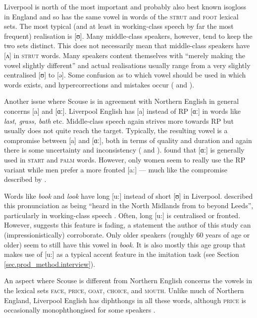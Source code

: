Liverpool is north of the most important and probably also best known isogloss in England and so has the same vowel in words of the \textsc{strut} and \textsc{foot} lexical sets.
The most typical (and at least in working-class speech by far the most frequent) realisation is [ʊ].
Many middle-class speakers, however, tend to keep the two sets distinct.
This does not necessarily mean that middle-class speakers have [ʌ] in \textsc{strut} words.
Many speakers content themselves with ``merely making the vowel slightly different'' \citep[284]{knowles1973} and actual realisations usually range from a very slightly centralised [ʊ] to [ə].
Some confusion as to which vowel should be used in which words exists, and hypercorrections and mistakes occur (\cite[286--287]{knowles1973} and \cite[83]{knowles1978}).

Another issue where Scouse is in agreement with Northern English in general concerns [a] and [ɑː].
Liverpool English has [a] instead of RP [ɑː] in words like \emph{last, grass, bath} etc.
Middle-class speech again strives more towards RP but usually does not quite reach the target.
Typically, the resulting vowel is a compromise between [a] and [ɑː], both in terms of quality and duration and again there is some uncertainty and inconsistency (\citealp[cf.][287--289]{knowles1973} and \citeyear[83--84]{knowles1978}).
\citeauthor{watson2007} found that [ɑː] is generally used in \textsc{start} and \textsc{palm} words.
However, only women seem to really use the RP variant while men prefer a more fronted [a:] \parencite[cf.][358]{watson2007} --- much like the compromise described by \cite{knowles1973}.

Words like \emph{book} and \emph{look} have long [u:] instead of short [ʊ] in Liverpool.
\citet{knowles1973} described this pronunciation as being ``heard in the North Midlands from  to beyond Leeds'', particularly in working-class speech \citep[290]{knowles1973}.
Often, long [u:] is centralised or fronted.
However, \citet[358]{watson2007} suggests this feature is fading, a statement the author of this study can (impressionistically) corroborate.
Only older speakers (roughly 60 years of age or older) seem to still have this vowel in \emph{book}.
It is also mostly this age group that makes use of [u:] as a typical accent feature in the imitation task (see Section \ref{sec.prod_method.interview}).

An aspect where Scouse is different from Northern English concerns the vowels in the lexical sets \textsc{face}, \textsc{price}, \textsc{goat}, \textsc{choice}, and \textsc{mouth}.
Unlike much of Northern England, Liverpool English has diphthongs in all these words, although \textsc{price} is occasionally monophthongised for some speakers \citep[cf.][358]{watson2007}.

